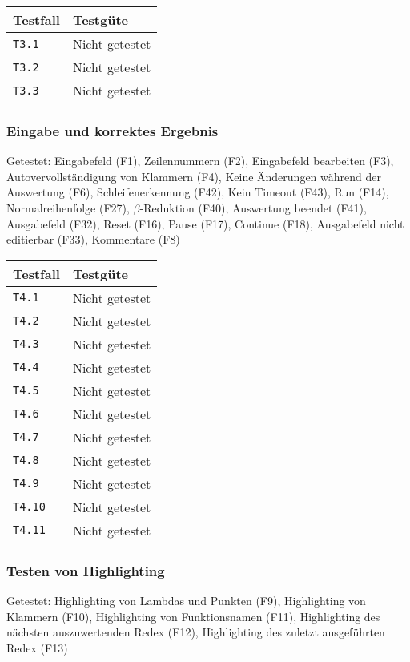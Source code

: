 \documentclass[parskip=full,11pt,twoside]{scrartcl}
\newcommand{\testline}[2]{
    \texttt{#1} & 
    \ifthenelse{\equal{#2}{Nicht getestet}}
        {\cellcolor{red!20}}
        {}
    \ifthenelse{\equal{#2}{Manuell getestet}}
        {\cellcolor{orange!20}}
        {}
    \ifthenelse{\equal{#2}{Automatisiert getestet}}
        {\cellcolor{green!20}}
        {}
    #2 \\ \hline
}
\begin{document}
    \label{shortcuts}
    \begin{center}
        \begin{tabular}{ p{9cm} p{4cm}}
            Testfall & Testgüte \\ \hline
            \testline{T3.1}{Nicht getestet}
            \testline{T3.2}{Nicht getestet}
            \testline{T3.3}{Nicht getestet}
        \end{tabular}
    \end{center}

\subsubsection{Eingabe und korrektes Ergebnis}
    Getestet:
    Eingabefeld (F1),
    Zeilennummern (F2),
    Eingabefeld bearbeiten (F3),
    Autovervollständigung von Klammern (F4),
    Keine Änderungen während der Auswertung (F6),
    Schleifenerkennung (F42),
    Kein Timeout (F43),
    Run (F14),
    Normalreihenfolge (F27),
    $\beta$-Reduktion (F40),
    Auswertung beendet (F41),
    Ausgabefeld (F32),
    Reset (F16),
    Pause (F17),
    Continue (F18),
    Ausgabefeld nicht editierbar (F33),
    Kommentare (F8)

    \label{shortcuts}
    \begin{center}
        \begin{tabular}{ p{9cm} p{4cm}}
            Testfall & Testgüte \\ \hline
            \testline{T4.1}{Nicht getestet}
            \testline{T4.2}{Nicht getestet}
            \testline{T4.3}{Nicht getestet}
            \testline{T4.4}{Nicht getestet}
            \testline{T4.5}{Nicht getestet}
            \testline{T4.6}{Nicht getestet}
            \testline{T4.7}{Nicht getestet}
            \testline{T4.8}{Nicht getestet}
            \testline{T4.9}{Nicht getestet}
            \testline{T4.10}{Nicht getestet}
            \testline{T4.11}{Nicht getestet}
        \end{tabular}
    \end{center}

\subsubsection{Testen von Highlighting}
    Getestet:
    Highlighting von Lambdas und Punkten (F9),
    Highlighting von Klammern (F10),
    Highlighting von Funktionsnamen (F11),
    Highlighting des nächsten auszuwertenden Redex (F12),
    Highlighting des zuletzt ausgeführten Redex (F13)
\end{document}
